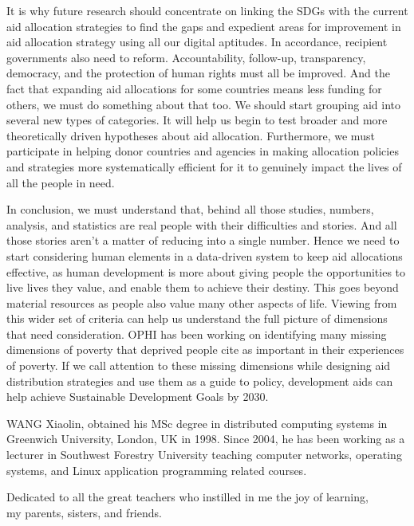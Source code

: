 \documentclass{swfuthesise}
\begin{document}
It is why future research should concentrate on linking the SDGs with the current aid allocation strategies to find the gaps and expedient areas for improvement in aid allocation strategy using all our digital aptitudes. In accordance, recipient governments also need to reform. Accountability, follow-up, transparency, democracy, and the protection of human rights must all be improved. And the fact that expanding aid allocations for some countries means less funding for others, we must do something about that too. We should start grouping aid into several new types of categories. It will help us begin to test broader and more theoretically driven hypotheses about aid allocation. Furthermore, we must participate in helping donor countries and agencies in making allocation policies and strategies more systematically efficient for it to genuinely impact the lives of all the people in need. 

In conclusion, we must understand that, behind all those studies, numbers, analysis, and statistics are real people with their difficulties and stories. And all those stories aren't a matter of reducing into a single number. Hence we need to start considering human elements in a data-driven system to keep aid allocations effective, as human development is more about giving people the opportunities to live lives they value, and enable them to achieve their destiny. This goes beyond material resources as people also value many other aspects of life. Viewing from this wider set of criteria can help us understand the full picture of dimensions that need consideration. OPHI has been working on identifying many missing dimensions of poverty that deprived people cite as important in their experiences of poverty. If we call attention to these missing dimensions while designing aid distribution strategies and use them as a guide to policy, development aids can help achieve Sustainable Development Goals by 2030.

\appendix%

\makebib %

\begin{advisorInfo} 
  WANG Xiaolin, obtained his MSc degree in distributed computing systems in Greenwich
  University, London, UK in 1998. Since 2004, he has been working as a lecturer in Southwest
  Forestry University teaching computer networks, operating systems, and Linux application
  programming related courses.  
\end{advisorInfo}

\begin{acknowledgment}
\begin{center}
 Dedicated to all the great teachers who instilled in me the joy of learning, \\my parents, sisters, and friends.  
\end{center}
\end{acknowledgment}
\end{document}
